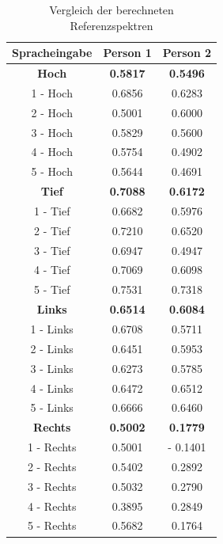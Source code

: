 \documentclass[12pt, oneside, a4paper, \docLanguage]{report}
\begin{document}
\begin{table}[H]
	\centering\small
	\begin{tabular}{||c | c | c||}
		 \hline
		 Spracheingabe & Person 1 & Person 2 \\ [0.5ex] 
		 \hline
		 \textbf{Hoch} & \textbf{0.5817} & \textbf{0.5496} \\ 
		 \hline
		 1 - Hoch & 0.6856 & 0.6283 \\ 
		 \hline
		 2 - Hoch & 0.5001 & 0.6000 \\ 
		 \hline
		 3 - Hoch & 0.5829 & 0.5600 \\ 
		 \hline
		 4 - Hoch & 0.5754 & 0.4902 \\ 
		 \hline
		 5 - Hoch & 0.5644 & 0.4691 \\ 
		 \hline
		 \textbf{Tief} & \textbf{0.7088} & \textbf{0.6172} \\
		 \hline
		 1 - Tief & 0.6682 & 0.5976 \\ 
		 \hline
		 2 - Tief & 0.7210 & 0.6520 \\ 
		 \hline
		 3 - Tief & 0.6947 &0.4947 \\ 
		 \hline
		 4 - Tief & 0.7069 &0.6098 \\ 
		 \hline
		 5 - Tief & 0.7531 & 0.7318 \\ 
		\hline
		\textbf{Links} & \textbf{0.6514} & \textbf{0.6084} \\
		\hline
		 1 - Links & 0.6708 & 0.5711 \\ 
		 \hline
		 2 - Links & 0.6451 & 0.5953 \\ 
		 \hline
		 3 - Links & 0.6273 & 0.5785 \\ 
		 \hline
		 4 - Links & 0.6472 & 0.6512 \\ 
		 \hline
		 5 - Links & 0.6666 &  0.6460 \\ 
		 \hline
		 \textbf{Rechts} & \textbf{0.5002} & \textbf{0.1779} \\
		 \hline
		 1 - Rechts & 0.5001 & - 0.1401 \\ 
		 \hline
		 2 - Rechts & 0.5402 & 0.2892 \\ 
		 \hline
		 3 - Rechts & 0.5032 & 0.2790 \\ 
		 \hline
		 4 - Rechts & 0.3895 & 0.2849 \\ 
		 \hline
		 5 - Rechts & 0.5682 & 0.1764 \\ 
		 \hline
	\end{tabular}
	\caption{Vergleich der berechneten Referenzspektren}
	\label{tab:tan}
\end{table}
\newpage
\end{document}
